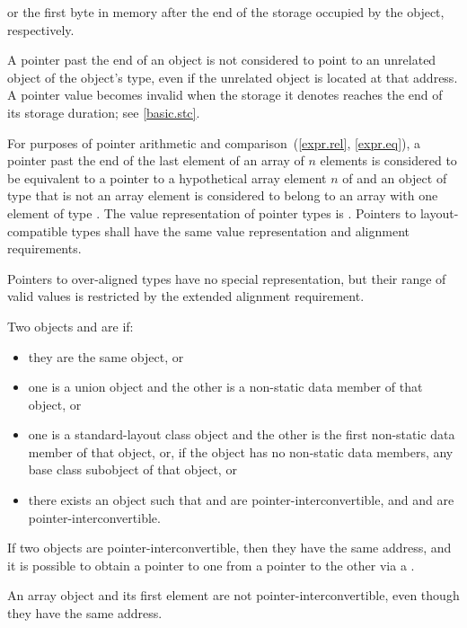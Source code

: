 or the first byte in memory
after the end of the storage occupied by the object,
respectively.
\begin{note}
A pointer past the end of an object
is not considered to point to an unrelated object
of the object's type,
even if the unrelated object is located at that address.
A pointer value becomes invalid
when the storage it denotes
reaches the end of its storage duration;
see \ref{basic.stc}.
\end{note}
For purposes of pointer arithmetic
and comparison~(\ref{expr.rel}, \ref{expr.eq}),
a pointer past the end of the last element of
an array  of $n$ elements
is considered to be equivalent to
a pointer to a hypothetical array element $n$ of  and
an object of type  that is not an array element
is considered to belong to an array with one element of type .
The value representation of
pointer types is . Pointers to
layout-compatible types shall
have the same value representation and alignment
requirements.
\begin{note}
Pointers to over-aligned types have no special
representation, but their range of valid values is restricted by the extended
alignment requirement.
\end{note}

\pnum
Two objects  and  are  if:
\begin{itemize}
\item
they are the same object, or
\item
one is a union object and
the other is a non-static data member of that object, or
\item
one is a standard-layout class object and
the other is the first non-static data member of that object, or,
if the object has no non-static data members,
any base class subobject of that object, or
\item
there exists an object  such that
 and  are pointer-interconvertible, and
 and  are pointer-interconvertible.
\end{itemize}
If two objects are pointer-interconvertible,
then they have the same address,
and it is possible to obtain a pointer to one
from a pointer to the other
via a .
\begin{note}
An array object and its first element are not pointer-interconvertible,
even though they have the same address.
\end{note}

